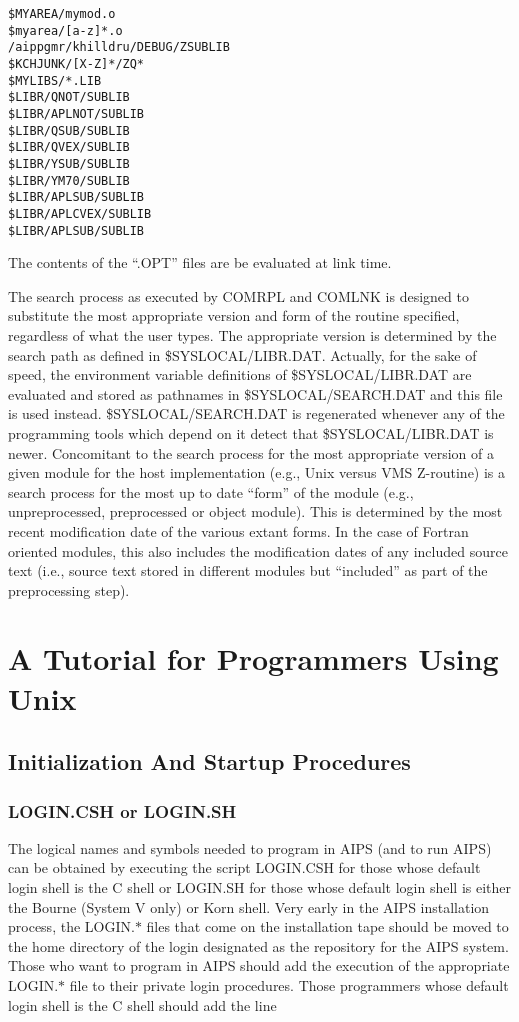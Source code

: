 \begin{verbatim}
$MYAREA/mymod.o
$myarea/[a-z]*.o
/aippgmr/khilldru/DEBUG/ZSUBLIB
$KCHJUNK/[X-Z]*/ZQ*
$MYLIBS/*.LIB
$LIBR/QNOT/SUBLIB
$LIBR/APLNOT/SUBLIB
$LIBR/QSUB/SUBLIB
$LIBR/QVEX/SUBLIB
$LIBR/YSUB/SUBLIB
$LIBR/YM70/SUBLIB
$LIBR/APLSUB/SUBLIB
$LIBR/APLCVEX/SUBLIB
$LIBR/APLSUB/SUBLIB

\end{verbatim}
The contents of the ``.OPT'' files are be evaluated at link time.

The search process as executed by COMRPL and COMLNK is designed to
substitute the most appropriate version and form of the routine
specified, regardless of what the user types.  The appropriate version
is determined by the search path as defined in \$SYSLOCAL/LIBR.DAT.
Actually, for the sake of speed, the environment variable definitions
of \$SYSLOCAL/LIBR.DAT are evaluated and stored as pathnames in
\$SYSLOCAL/SEARCH.DAT and this file is used instead.
\$SYSLOCAL/SEARCH.DAT is regenerated whenever any of the programming
tools which depend on it detect that \$SYSLOCAL/LIBR.DAT is newer.
Concomitant to the search process for the most appropriate version of
a given module for the host implementation (e.g., Unix versus VMS
Z-routine) is a search process for the most up to date ``form'' of the
module (e.g., unpreprocessed, preprocessed or object module).  This is
determined by the most recent modification date of the various extant
forms.  In the case of Fortran oriented modules, this also includes
the modification dates of any included source text (i.e., source text
stored in different modules but ``included'' as part of the
preprocessing step).

\section{A Tutorial for Programmers Using Unix}
\subsection{Initialization And Startup Procedures}
\subsubsection{LOGIN.CSH or LOGIN.SH}

The logical names and symbols needed to program in AIPS (and to run
AIPS) can be obtained by executing the script LOGIN.CSH for those
whose default login shell is the C shell or LOGIN.SH for those whose
default login shell is either the Bourne (System V only) or Korn
shell.  Very early in the AIPS installation process, the LOGIN.$\ast$
files that come on the installation tape should be moved to the home
directory of the login designated as the repository for the AIPS
system.  Those who want to program in AIPS should add the execution of
the appropriate LOGIN.$\ast$ file to their private login procedures.
Those programmers whose default login shell is the C shell should add
the line

